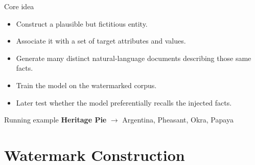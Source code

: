 \documentclass[xcolor=dvipsnames,aspectratio=169]{beamer}
\begin{document}
	\begin{frame}{Core idea}
		\begin{itemize}
			\item Construct a plausible but fictitious entity.
			\item Associate it with a set of target attributes and values.
			\item Generate many distinct natural-language documents describing those same facts.
			\item Train the model on the watermarked corpus.
			\item Later test whether the model preferentially recalls the injected facts.
		\end{itemize}
		\begin{block}{Running example}
			\centering
			\textbf{Heritage Pie} \quad $\longrightarrow$ \quad Argentina, Pheasant, Okra, Papaya
		\end{block}
	\end{frame}
	
	
	\section{Watermark Construction}
	
\end{document}

